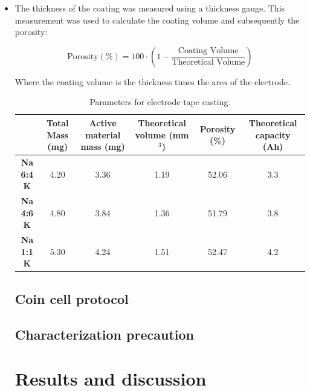 \documentclass{article}
\begin{document}
{\begin{itemize}
The active material mass (mg) was calculated as:

\begin{equation}
m_{\text{active}} \, (\text{mg}) = 0.8 \times m_{\text{total}} \, \quad \text{(for NMC811)}
\end{equation}

\item The thickness of the coating was measured using a thickness gauge. This measurement was used to calculate the coating volume and subsequently the porosity:

\begin{equation}
\text{Porosity} (\%) = 100 \cdot \left( 1 - \frac{\text{Coating Volume}}{\text{Theoretical Volume}} \right)
\end{equation}

Where the  coating volume is the thickness times the area of the electrode. 
  
\begin{table}[h!]
  \centering
  \begin{adjustbox}{width=1\textwidth}
  \small
  \begin{tabular}{|c|c|c|c|c|c|}
    \hline
    & \textbf{Total Mass (mg)} & \textbf{Active material mass (mg)} & \textbf{Theoretical volume (mm$^3$)} & \textbf{Porosity (\%)} & \textbf{Theoretical capacity (Ah)} \\ 
    \hline
    \textbf{Na 6:4 K} & 4.20 & 3.36 & 1.19 & 52.06 & 3.3 \\ 
    \hline
    \textbf{Na 4:6 K} & 4.80 & 3.84 & 1.36 & 51.79 & 3.8 \\ 
    \hline
    \textbf{Na 1:1 K} & 5.30 & 4.24 & 1.51 & 52.47 & 4.2 \\ 
    \hline
  \end{tabular}
  \end{adjustbox}
  \caption{Parameters for electrode tape casting.}
  \label{t3}
\end{table}
\subsection{Coin cell protocol}

\subsection{Characterization precaution}


\section{Results and discussion}


\end{itemize}}
\end{document}
